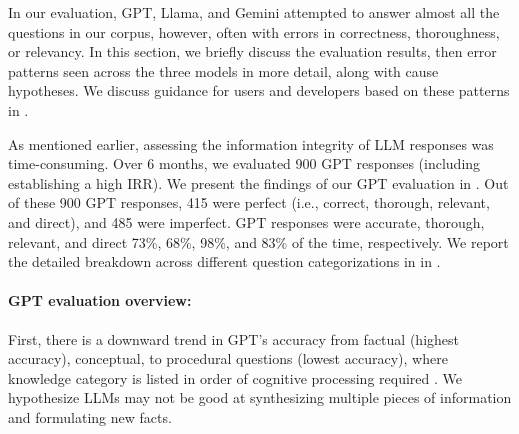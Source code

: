 In our evaluation, GPT, Llama, and Gemini attempted to answer almost all the questions in our corpus, however, often with errors in correctness, thoroughness, or relevancy. In this section, we briefly discuss the evaluation results, then  error patterns seen across the three models in more detail, along with cause hypotheses. We discuss guidance for users and developers based on these patterns in .


As mentioned earlier, assessing the information integrity of LLM responses was time-consuming. Over 6 %
months, we evaluated 900 GPT responses (including establishing a high IRR). We present the findings of our GPT evaluation in . Out of these 900 GPT responses, 415 were perfect (i.e., correct, thorough, relevant, and direct), and 485 were imperfect. GPT responses were accurate, thorough, relevant, and direct 73\%, 68\%, 98\%, and 83\% of the time, respectively. We report the detailed breakdown across different question categorizations in  in . 







 


\paragraph{GPT evaluation overview:} First, there is a downward trend in GPT's accuracy from factual (highest accuracy), conceptual, to procedural questions (lowest accuracy), where knowledge category is listed in order of cognitive processing required \cite{blooms-taxonomy-2001}. We hypothesize LLMs may not be good at synthesizing multiple pieces of information and formulating new facts.

